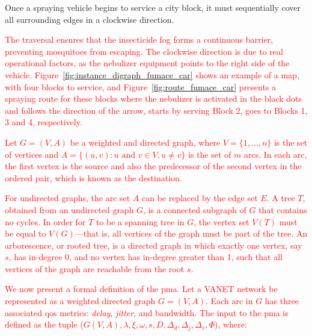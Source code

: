  Once a spraying vehicle begins to service a city block, it must sequentially cover all surrounding edges in a clockwise direction. \textcolor{red}{The traversal ensures that the insecticide fog forms a continuous barrier, preventing mosquitoes from escaping. The clockwise direction is due to real operational factors, as the nebulizer equipment points to the right side of the vehicle.
Figure~\ref{fig:instance_digraph_fumace_car} shows an example of a map,
with four blocks to service, and Figure~\ref{fig:route_fumace_car} presents a spraying route for these blocks where the nebulizer is activated in the black dots and follows the direction of the arrow, starts by serving Block 2, goes to Blocks 1, 3 and 4, respectively.

Let $G = (V, A)$ be a weighted and directed graph, where $V = \{1, \dots, n\}$ is the set of vertices and $A = \{(u, v) : u \text{ and } v \in V, u \neq v\}$ is the set of $m$ arcs. In each arc, the first vertex is the source and also the predecessor of the second vertex in the ordered pair, which is known as the destination.

For undirected graphs, the arc set $A$ can be replaced by the edge set $E$. A tree $T$, obtained from an undirected graph $G$, is a connected subgraph of $G$ that contains no cycles. In order for $T$ to be a spanning tree in $G$, the vertex set $V(T)$ must be equal to $V(G)$—that is, all vertices of the graph must be part of the tree. An arborescence, or rooted tree, is a directed graph in which exactly one vertex, say $s$, has in-degree 0, and no vertex has in-degree greater than 1, such that all vertices of the graph are reachable from the root $s$.

We now present a formal definition of the \gls{pma}. Let a VANET network be represented as a weighted directed graph $G = (V, A)$. Each arc in $G$ has three associated \gls{qos} metrics: \textit{delay}, \textit{jitter}, and bandwidth. The input to the \gls{pma} is defined as the tuple ($G(V, A), \lambda, \xi, \omega, s, D, \Delta_{d}, \Delta_{j}, \Delta_{v}, \Phi$), where:

}
